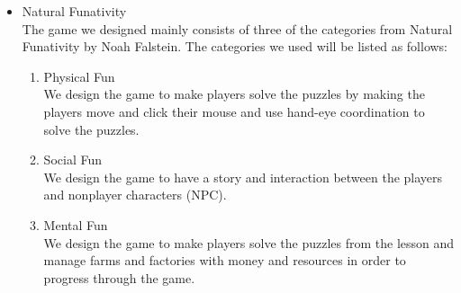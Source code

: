 \documentclass[12pt,oneside,openright,a4paper]{cpe-english-project}
\begin{document}
\begin{itemize}
\item Natural Funativity \\
The game we designed mainly consists of three of the categories from Natural Funativity by Noah Falstein. The categories we used will be listed as follows:
\begin{enumerate}
	\item Physical Fun \\
	We design the game to make players solve the puzzles by making the players move and click their mouse and use hand-eye coordination to solve the puzzles.
	\item Social Fun \\
	We design the game to have a story and interaction between the 
players and nonplayer characters (NPC).
	\item Mental Fun \\
	We design the game to make players solve the puzzles from the lesson and manage farms and factories with money and resources in order to progress through the game.
\end{enumerate}


\end{itemize}
\end{document}
